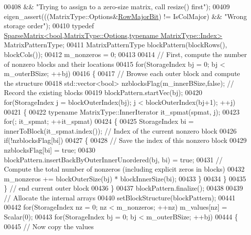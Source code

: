 \begin{DoxyCode}
00408                    && \textcolor{stringliteral}{"Trying to assign to a zero-size matrix, call resize() first"});
00409       eigen\_assert(((MatrixType::Options&\hyperlink{group__flags_gae4f56c2a60bbe4bd2e44c5b19cbe8762}{RowMajorBit}) != IsColMajor) && \textcolor{stringliteral}{"Wrong storage order"});
00410       \textcolor{keyword}{typedef} \hyperlink{group___sparse_core___module_class_eigen_1_1_sparse_matrix}{SparseMatrix<bool,MatrixType::Options,typename MatrixType::Index>}
       MatrixPatternType;
00411       MatrixPatternType  blockPattern(blockRows(), blockCols());
00412       m\_nonzeros = 0;
00413 
00414       \textcolor{comment}{// First, compute the number of nonzero blocks and their locations}
00415       \textcolor{keywordflow}{for}(StorageIndex bj = 0; bj < m\_outerBSize; ++bj)
00416       \{
00417         \textcolor{comment}{// Browse each outer block and compute the structure}
00418         std::vector<bool> nzblocksFlag(m\_innerBSize,\textcolor{keyword}{false});  \textcolor{comment}{// Record the existing blocks}
00419         blockPattern.startVec(bj);
00420         \textcolor{keywordflow}{for}(StorageIndex j = blockOuterIndex(bj); j < blockOuterIndex(bj+1); ++j)
00421         \{
00422           \textcolor{keyword}{typename} MatrixType::InnerIterator it\_spmat(spmat, j);
00423           \textcolor{keywordflow}{for}(; it\_spmat; ++it\_spmat)
00424           \{
00425             StorageIndex bi = innerToBlock(it\_spmat.index()); \textcolor{comment}{// Index of the current nonzero block}
00426             \textcolor{keywordflow}{if}(!nzblocksFlag[bi])
00427             \{
00428               \textcolor{comment}{// Save the index of this nonzero block}
00429               nzblocksFlag[bi] = \textcolor{keyword}{true};
00430               blockPattern.insertBackByOuterInnerUnordered(bj, bi) = \textcolor{keyword}{true};
00431               \textcolor{comment}{// Compute the total number of nonzeros (including explicit zeros in blocks)}
00432               m\_nonzeros += blockOuterSize(bj) * blockInnerSize(bi);
00433             \}
00434           \}
00435         \} \textcolor{comment}{// end current outer block}
00436       \}
00437       blockPattern.finalize();
00438 
00439       \textcolor{comment}{// Allocate the internal arrays}
00440       setBlockStructure(blockPattern);
00441 
00442       \textcolor{keywordflow}{for}(StorageIndex nz = 0; nz < m\_nonzeros; ++nz) m\_values[nz] = Scalar(0);
00443       \textcolor{keywordflow}{for}(StorageIndex bj = 0; bj < m\_outerBSize; ++bj)
00444       \{
00445         \textcolor{comment}{// Now copy the values}

\end{DoxyCode}
